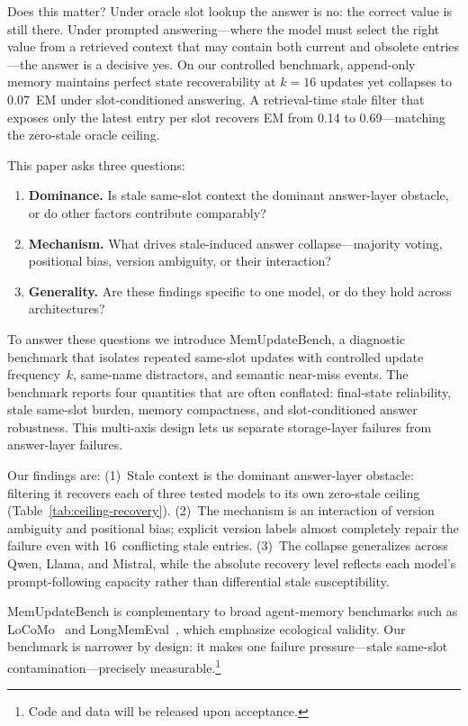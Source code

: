 \documentclass[11pt,twocolumn]{article}
\begin{document}
Does this matter?  Under oracle slot lookup the answer is no: the correct value is still there.
Under prompted answering---where the model must select the right value from a retrieved context that may contain both current and obsolete entries---the answer is a decisive yes.
On our controlled benchmark, append-only memory maintains perfect state recoverability at \(k{=}16\) updates yet collapses to 0.07~EM under slot-conditioned answering.
A retrieval-time stale filter that exposes only the latest entry per slot recovers EM from 0.14 to 0.69---matching the zero-stale oracle ceiling.

This paper asks three questions:
\begin{enumerate}
\item \textbf{Dominance.}  Is stale same-slot context the dominant answer-layer obstacle, or do other factors contribute comparably?
\item \textbf{Mechanism.}  What drives stale-induced answer collapse---majority voting, positional bias, version ambiguity, or their interaction?
\item \textbf{Generality.}  Are these findings specific to one model, or do they hold across architectures?
\end{enumerate}

To answer these questions we introduce MemUpdateBench, a diagnostic benchmark that isolates repeated same-slot updates with controlled update frequency~\(k\), same-name distractors, and semantic near-miss events.
The benchmark reports four quantities that are often conflated: final-state reliability, stale same-slot burden, memory compactness, and slot-conditioned answer robustness.
This multi-axis design lets us separate storage-layer failures from answer-layer failures.

Our findings are:
(1)~Stale context is the dominant answer-layer obstacle: filtering it recovers each of three tested models to its own zero-stale ceiling (Table~\ref{tab:ceiling-recovery}).
(2)~The mechanism is an interaction of version ambiguity and positional bias; explicit version labels almost completely repair the failure even with 16~conflicting stale entries.
(3)~The collapse generalizes across Qwen, Llama, and Mistral, while the absolute recovery level reflects each model's prompt-following capacity rather than differential stale susceptibility.

MemUpdateBench is complementary to broad agent-memory benchmarks such as LoCoMo~\citep{locomo} and LongMemEval~\citep{longmemeval}, which emphasize ecological validity.
Our benchmark is narrower by design: it makes one failure pressure---stale same-slot contamination---precisely measurable.\footnote{Code and data will be released upon acceptance.}
\end{document}
